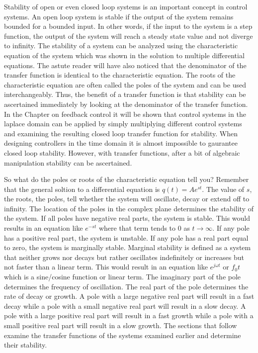 Stability of open or even closed loop systems is an important concept in control systems. An open loop system is stable if the output of the system remains bounded for a bounded input. In other words, if the input to the system is a step function, the output of the system will reach a steady state value and not diverge to infinity. The stability of a system can be analyzed using the characteristic equation of the system which was shown in the solution to multiple differential equations. The astute reader will have also noticed that the denominator of the transfer function is identical to the characteristic equation. The roots of the characteristic equation are often called the poles of the system and can be used interchangeably. Thus, the benefit of a transfer function is that stability can be ascertained immediately by looking at the denominator of the transfer function. In the Chapter on feedback control it will be shown that control systems in the laplace domain can be applied by simply multiplying different control systems and examining the resulting closed loop transfer function for stability. When designing controllers in the time domain it is almost impossible to gaurantee closed loop stability. However, with transfer functions, after a bit of algebraic manipulation stability can be ascertained. 

So what do the poles or roots of the characteristic equation tell you? Remember that the general soltion to a differential equation is $q(t) = Ae^{st}$. The value of $s$, the roots, the poles, tell whether the system will oscillate, decay or extend off to infinity. The location of the poles in the complex plane determines the stability of the system. If all poles have negative real parts, the system is stable. This would results in an equation like $e^{-st}$ where that term tends to 0 as $t \rightarrow \infty$. If any pole has a positive real part, the system is unstable. If any pole has a real part equal to zero, the system is marginally stable. Marginal stability is defined as a system that neither grows nor decays but rather oscillates indefinitely or increases but not faster than a linear term. This would result in an equation like $e^{j\omega t}$  or $f_0 t$ which is a sine/cosine function or linear term. The imaginary part of the pole determines the frequency of oscillation. The real part of the pole determines the rate of decay or growth. A pole with a large negative real part will result in a fast decay while a pole with a small negative real part will result in a slow decay. A pole with a large positive real part will result in a fast growth while a pole with a small positive real part will result in a slow growth. The sections that follow examine the transfer functions of the systems examined earlier and determine their stability. 

